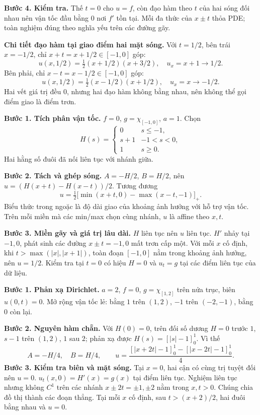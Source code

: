 \textbf{Bước 4. Kiểm tra.} Thế $t=0$ cho $u=f$, còn đạo hàm theo $t$ của hai sóng đối nhau nên vận tốc đầu bằng $0$ nơi $f'$ tồn tại. Mỗi đa thức của $x\pm t$ thỏa PDE; toàn nghiệm đúng theo nghĩa yếu trên các đường gãy.

\textbf{Chi tiết đạo hàm tại giao điểm hai mặt sóng.} Với $t=1/2$, bên trái $x=-1/2$, chỉ $x+t=x+1/2\in[-1,0]$ góp:
\[u(x,1/2)=\tfrac12(x+1/2)(x+3/2),\quad u_x=x+1\to1/2.\]
Bên phải, chỉ $x-t=x-1/2\in[-1,0]$ góp:
\[u(x,1/2)=\tfrac12(x-1/2)(x+1/2),\quad u_x=x\to-1/2.\]
Hai vết giá trị đều $0$, nhưng hai đạo hàm không bằng nhau, nên không thể gọi điểm giao là điểm trơn.

\textbf{Bước 1. Tích phân vận tốc.} $f=0$, $g=\chi_{[-1,0]}$, $a=1$. Chọn
\[H(s)=\begin{cases}0&s\le-1,\\s+1&-1<s<0,\\1&s\ge0.\end{cases}\]
Hai hằng số đuôi đã nối liên tục với nhánh giữa.

\textbf{Bước 2. Tách và ghép sóng.} $A=-H/2$, $B=H/2$, nên $u=(H(x+t)-H(x-t))/2$. Tương đương
\[u=\tfrac12\big[\min(x+t,0)-\max(x-t,-1)\big]_+.\]
Biểu thức trong ngoặc là độ dài giao của khoảng ảnh hưởng với hỗ trợ vận tốc. Trên mỗi miền mà các min/max chọn cùng nhánh, $u$ là affine theo $x,t$.

\textbf{Bước 3. Miền gãy và giá trị lâu dài.} $H$ liên tục nên $u$ liên tục. $H'$ nhảy tại $-1,0$, phát sinh các đường $x\pm t=-1,0$ mất trơn cấp một. Với mỗi $x$ cố định, khi $t>\max(|x|,|x+1|)$, toàn đoạn $[-1,0]$ nằm trong khoảng ảnh hưởng, nên $u=1/2$. Kiểm tra tại $t=0$ có hiệu $H=0$ và $u_t=g$ tại các điểm liên tục của dữ liệu.

\textbf{Bước 1. Phản xạ Dirichlet.} $a=2$, $f=0$, $g=\chi_{[1,2]}$ trên nửa trục, biên $u(0,t)=0$. Mở rộng vận tốc lẻ: bằng $1$ trên $(1,2)$, $-1$ trên $(-2,-1)$, bằng $0$ còn lại.

\textbf{Bước 2. Nguyên hàm chẵn.} Với $H(0)=0$, trên đối số dương $H=0$ trước $1$, $s-1$ trên $(1,2)$, $1$ sau $2$; phản xạ được $H(s)=[|s|-1]_0^1$. Vì thế
\[A=-H/4,\quad B=H/4,\qquad u=\frac{[|x+2t|-1]_0^1-[|x-2t|-1]_0^1}{4}.\]
\textbf{Bước 3. Kiểm tra biên và mặt sóng.} Tại $x=0$, hai cận có cùng trị tuyệt đối nên $u=0$. $u_t(x,0)=H'(x)=g(x)$ tại điểm liên tục. Nghiệm liên tục nhưng không $C^1$ trên các nhánh $x\pm2t=\pm1,\pm2$ nằm trong $x,t>0$. Chúng chia đồ thị thành các đoạn thẳng. Tại mỗi $x$ cố định, sau $t>(x+2)/2$, hai đuôi bằng nhau và $u=0$.

